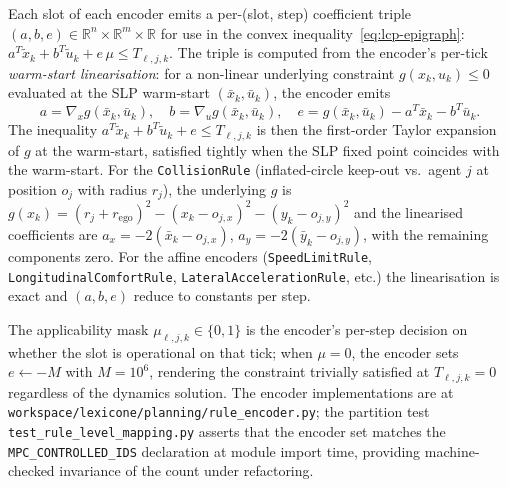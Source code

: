 Each slot of each encoder emits a per-(slot, step) coefficient triple $(a, b, e) \in \mathbb{R}^{n} \times \mathbb{R}^{m} \times \mathbb{R}$ for use in the convex inequality~\eqref{eq:lcp-epigraph}: $a^{T} \tilde{x}_{k} + b^{T} \tilde{u}_{k} + e\, \mu \leq T_{\ell, j, k}$. The triple is computed from the encoder's per-tick \emph{warm-start linearisation}: for a non-linear underlying constraint $g(x_k, u_k) \leq 0$ evaluated at the SLP warm-start $(\bar x_k, \bar u_k)$, the encoder emits
\begin{equation}
    a = \nabla_x g(\bar x_k, \bar u_k),\quad b = \nabla_u g(\bar x_k, \bar u_k),\quad e = g(\bar x_k, \bar u_k) - a^T \bar x_k - b^T \bar u_k.
    \label{eq:encoder-triple}
\end{equation}
The inequality $a^T \tilde x_k + b^T \tilde u_k + e \leq T_{\ell,j,k}$ is then the first-order Taylor expansion of $g$ at the warm-start, satisfied tightly when the SLP fixed point coincides with the warm-start. For the \texttt{CollisionRule} (inflated-circle keep-out vs.\ agent $j$ at position $o_j$ with radius $r_j$), the underlying $g$ is $g(x_k) = (r_j + r_{\mathrm{ego}})^2 - (x_k - o_{j,x})^2 - (y_k - o_{j,y})^2$ and the linearised coefficients are $a_x = -2(\bar x_k - o_{j,x})$, $a_y = -2(\bar y_k - o_{j,y})$, with the remaining components zero. For the affine encoders (\texttt{SpeedLimitRule}, \texttt{LongitudinalComfortRule}, \texttt{LateralAccelerationRule}, etc.) the linearisation is exact and $(a, b, e)$ reduce to constants per step.

The applicability mask $\mu_{\ell, j, k} \in \{0, 1\}$ is the encoder's per-step decision on whether the slot is operational on that tick; when $\mu = 0$, the encoder sets $e \leftarrow -M$ with $M = 10^{6}$, rendering the constraint trivially satisfied at $T_{\ell, j, k} = 0$ regardless of the dynamics solution. The encoder implementations are at \texttt{workspace/lexicone/planning/rule\_encoder.py}; the partition test \texttt{test\_rule\_level\_mapping.py} asserts that the encoder set matches the \texttt{MPC\_CONTROLLED\_IDS} declaration at module import time, providing machine-checked invariance of the count under refactoring.
